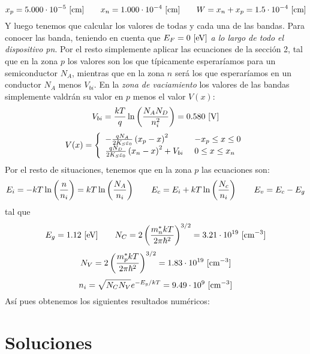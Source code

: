 \begin{texercise}
\begin{enumerate}[label=\alph*)]
        \begin{equation}
            x_p = 5.000\cdot 10^{-5}  \ [\text{cm}] \qquad x_n =1.000\cdot 10^{-4}  \ [\text{cm}] \qquad W = x_n + x_p = 1.5 \cdot 10^{-4} \ [\text{cm} ]
        \end{equation}
        Y luego tenemos que calcular los valores de todas y cada una de las bandas. Para conocer las banda, teniendo en cuenta que $E_F=0 \ [\text{eV}]$  \textit{a lo largo de todo el dispositivo pn}. Por el resto simplemente aplicar las ecuaciones de la sección 2, tal que en la zona $p$ los valores son los que típicamente esperaríamos para un semiconductor $N_A$, mientras que en la zona $n$ será los que esperaríamos en un conductor $N_A$ menos $V_{bi}$. En la \textit{zona de vaciamiento} los valores de las bandas simplemente valdrán su valor en $p$ menos el valor $V(x)$:
        \begin{equation*}
            V_{bi} = \frac{kT}{q} \ln \parentesis{\frac{N_AN_D}{n_i^2}} = 0.580 \ [\unit{V}]
        \end{equation*}
        \begin{equation*}
            V(x) = \left\lbrace \begin{array}{ll}
                - \frac{qN_A}{2K_S\varepsilon_0} \left( x_p - x \right)^2  & \ - x_p \leq x \leq 0 \\
                \frac{qN_D}{2K_S\varepsilon_0} \left( x_n - x \right)^2 + V_{bi}  & \ 0 \leq x \leq x_n \\
            \end{array} \right.
        \end{equation*}
        Por el resto de situaciones, tenemos que en la zona $p$ las ecuaciones son:
        \begin{equation*}
            E_i = - kT \ln \left( \frac{n}{n_i} \right) = kT \ln \left( \frac{N_A}{n_i} \right) \qquad E_c  = E_i  + kT \ln \left( \frac{N_c}{n_i}  \right) \qquad E_v  =E_c-E_g
        \end{equation*}
        tal que 
        \begin{equation*}
            E_g = 1.12 \ [\eV] \qquad N_C = 2 \parentesis{\frac{m_n^* kT}{2\pi \hbar^2}}^{3/2}  = 3.21 \cdot 10^{19} \ [\cm^{-3}] \end{equation*}
        \begin{equation*}    
           N_V = 2 \left( \frac{m_p^* kT}{2\pi \hbar^2} \right)^{3/2} = 1.83 \cdot 10^{19} \ [\text{cm}^{-3}] 
        \end{equation*}
        \begin{equation*}
            n_i = \sqrt{N_CN_V} e^{-E_g/kT} = 9.49 \cdot 10^9 \ [\text{cm}^{-3}]
        \end{equation*}
        Así pues obtenemos los siguientes resultados numéricos: 
    \end{enumerate}
\end{texercise}


\tcbstoprecording

\section{Soluciones}

\tcbinputrecords







